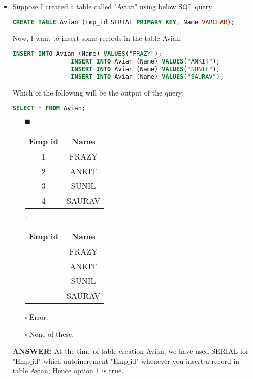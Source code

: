 \documentclass[10pt]{article}
\newcommand{\lightrule}{%
	\arrayrulecolor{black!30}%
	\midrule[\lightrulewidth]%
	\arrayrulecolor{black}}
\begin{document}
\begin{itemize}
		\item Suppose I created a table called "Avian" using below SQL query: 
			\begin{lstlisting}[language=SQL,firstline=1, lastline=1] 
				CREATE TABLE Avian (Emp_id SERIAL PRIMARY KEY, Name VARCHAR);
			\end{lstlisting}
			Now, I want to insert some records in the table Avian:
			\begin{lstlisting}[language=SQL,firstline=1, lastline=4] 
				INSERT INTO Avian (Name) VALUES("FRAZY");
				INSERT INTO Avian (Name) VALUES("ANKIT");
				INSERT INTO Avian (Name) VALUES("SUNIL");
				INSERT INTO Avian (Name) VALUES("SAURAV");
			\end{lstlisting}
			Which of the following will be the output of the query:
			\begin{lstlisting}[language=SQL,firstline=1, lastline=1] 
				SELECT * FROM Avian;
			\end{lstlisting}

			\begin{enumerate}
				\item[$\blacksquare$]
					\begin{tabular}{@{} *{2}{c} @{}}
						\toprule
							\textbf{Emp$\_$id} & \textbf{Name} \\
						\midrule
							1 & FRAZY \\
						\lightrule
							2 & ANKIT \\
						\lightrule
							3 & SUNIL \\
						\lightrule
							4 & SAURAV \\
						\bottomrule
					\end{tabular}

				\item[$\square$]
					\begin{tabular}{@{} *{2}{c} @{}}
						\toprule
							\textbf{Emp$\_$id} & \textbf{Name} \\
						\midrule
							& FRAZY \\
						\lightrule
							& ANKIT \\
						\lightrule
							& SUNIL \\
						\lightrule
							& SAURAV \\
						\bottomrule
					\end{tabular}

				\item[$\square$] Error.
				\item[$\square$] None of these.
			\end{enumerate}
			\color{red} \textbf{ANSWER:} \color{black} At the time of table creation Avian, we have used SERIAL for "Emp$\_$id" which autoincrement "Emp$\_$id" whenever you insert a record in table Avian; Hence option 1 is true.
	\end{itemize}
\end{document}
